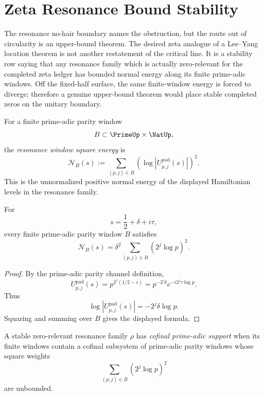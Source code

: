 \section{Zeta Resonance Bound Stability}
\label{sec:unified-reality-zeta-resonance-bound-stability}

The resonance no-hair boundary names the obstruction, but the route out
of circularity is an upper-bound theorem.  The desired zeta analogue of a
Lee--Yang location theorem is not another restatement of the critical
line.  It is a stability row saying that any resonance family which is
actually zero-relevant for the completed zeta ledger has bounded normal
energy along its finite prime-adic windows.  Off the fixed-half surface,
the same finite-window energy is forced to diverge; therefore a genuine
upper-bound theorem would place stable completed zeros on the unitary
boundary.

\begin{definition}
\label{def:unified-reality-resonance-window-square-energy}
For a finite prime-adic parity window
$$
B\subset\PrimeUp\times\NatUp,
$$
the \emph{resonance window square energy} is
$$
\mathcal N_B(s)
:=
\sum_{(p,j)\in B}
\left(
\log |U_{p,j}^{\mathrm{pad}}(s)|
\right)^2.
$$
This is the unnormalized positive normal energy of the displayed
Hamiltonian levels in the resonance family.
\end{definition}

\begin{theorem}
\label{thm:unified-reality-finite-resonance-energy-reads-off-half-displacement}
For
$$
s=\frac12+\delta+i\tau,
$$
every finite prime-adic parity window $B$ satisfies
$$
\mathcal N_B(s)
=
\delta^2
\sum_{(p,j)\in B}(2^j\log p)^2.
$$
\end{theorem}

\begin{proof}
By the prime-adic parity channel definition,
$$
U_{p,j}^{\mathrm{pad}}(s)
=
p^{2^j(1/2-s)}
=
p^{-2^j\delta}e^{-i2^j\tau\log p}.
$$
Thus
$$
\log |U_{p,j}^{\mathrm{pad}}(s)|
=
-2^j\delta\log p.
$$
Squaring and summing over $B$ gives the displayed formula.
\end{proof}

\begin{definition}
\label{def:unified-reality-cofinal-resonance-support}
A stable zero-relevant resonance family $\rho$ has \emph{cofinal
prime-adic support} when its finite windows contain a cofinal subsystem
of prime-adic parity windows whose square weights
$$
\sum_{(p,j)\in B}(2^j\log p)^2
$$
are unbounded.
\end{definition}

